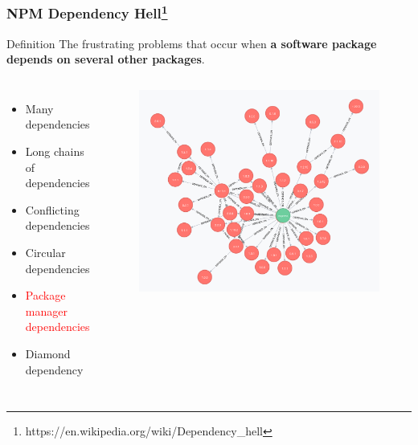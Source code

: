 \documentclass{beamer}
\begin{document}
\begin{frame}
\frametitle{NPM Dependency Hell\footnote{https://en.wikipedia.org/wiki/Dependency\_hell}}
\begin{block}{Definition}
The frustrating problems that occur when \textbf{a software package depends on several other packages}.
\end{block}
\begin{columns}
\begin{itemize}
    \item Many dependencies
    \item Long chains of dependencies
    \item Conflicting dependencies
    \item Circular dependencies
    \item \textcolor{red}{Package manager dependencies}
    \item Diamond dependency
\end{itemize}
\begin{figure}
    \centering
    \includegraphics[width=\textwidth]{hell.png}
\end{figure}
\end{columns}
\end{frame}
\end{document}
